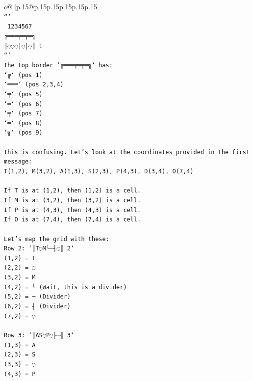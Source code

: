 \documentclass{article}
\begin{document}
{\begin{supertabular}{c@{$\;$}|p{.15\linewidth}@{}p{.15\linewidth}p{.15\linewidth}p{.15\linewidth}p{.15\linewidth}p{.15\linewidth}}
{{{\\ 
\texttt{```} \\
\texttt{ 1234567} \\
\texttt{╔═══╤═╤═╗} \\
\texttt{║◌◌◌│◌│◌║ 1} \\
\texttt{```} \\
\texttt{The top border `╔═══╤═╤═╗` has:} \\
\texttt{`╔` (pos 1)} \\
\texttt{`═══` (pos 2,3,4)} \\
\texttt{`╤` (pos 5)} \\
\texttt{`═` (pos 6)} \\
\texttt{`╤` (pos 7)} \\
\texttt{`═` (pos 8)} \\
\texttt{`╗` (pos 9)} \\
\\ 
\texttt{This is confusing. Let's look at the coordinates provided in the first message:} \\
\texttt{T(1,2), M(3,2), A(1,3), S(2,3), P(4,3), D(3,4), O(7,4)} \\
\\ 
\texttt{If T is at (1,2), then (1,2) is a cell.} \\
\texttt{If M is at (3,2), then (3,2) is a cell.} \\
\texttt{If P is at (4,3), then (4,3) is a cell.} \\
\texttt{If O is at (7,4), then (7,4) is a cell.} \\
\\ 
\texttt{Let's map the grid with these:} \\
\texttt{Row 2: `║T◌M└─┤◌║ 2`} \\
\texttt{(1,2) = T} \\
\texttt{(2,2) = ◌} \\
\texttt{(3,2) = M} \\
\texttt{(4,2) = └ (Wait, this is a divider)} \\
\texttt{(5,2) = ─ (Divider)} \\
\texttt{(6,2) = ┤ (Divider)} \\
\texttt{(7,2) = ◌} \\
\\ 
\texttt{Row 3: `║AS◌P◌├─╢ 3`} \\
\texttt{(1,3) = A} \\
\texttt{(2,3) = S} \\
\texttt{(3,3) = ◌} \\
\texttt{(4,3) = P} \\
}}}
\end{supertabular}}
\end{document}
